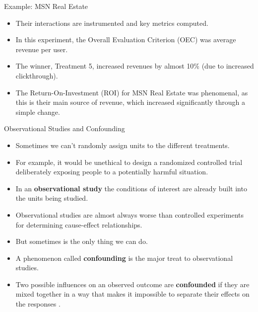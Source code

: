 \documentclass[handout]{beamer}
\begin{document}
\begin{frame}{Example: MSN Real Estate}
\scriptsize{


\begin{itemize}


 
 \item Their interactions are instrumented and key metrics computed. 
 
 \item In this experiment, the Overall Evaluation Criterion (OEC) was average revenue per user.
 \item The winner, Treatment 5, increased revenues by almost 10\% (due to increased clickthrough).
 
 \item The Return-On-Investment (ROI) for MSN Real Estate was phenomenal, as this is their main source of revenue, which increased significantly through a simple change.

\end{itemize}



} 
\end{frame}




\begin{frame}{Observational Studies and Confounding}
\scriptsize{

\begin{itemize}

 \item Sometimes we can't randomly assign units to the different treatments.
 
 \item For example, it would be unethical to design a randomized controlled trial deliberately exposing people to a potentially harmful situation. 
 
 \item In an \textbf{observational study} the conditions of interest are already built into the units being studied.
 
 \item Observational studies are almost always worse than controlled experiments for determining cause-effect relationships.
 
 \item But sometimes is the only thing we can do.
 
 \item A phenomenon called \textbf{confounding} is the major treat to observational studies.
 
 \item Two possible influences on an observed outcome are \textbf{confounded} if they are mixed together in a way that makes it impossible to separate their effects on the responses \cite{watkins2010statistics}.
  
\end{itemize}



} 
\end{frame}
\end{document}
